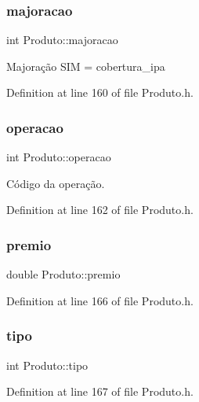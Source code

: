\subsubsection{\texorpdfstring{majoracao}{majoracao}}
{\footnotesize\ttfamily int Produto\+::majoracao\hspace{0.3cm}{\ttfamily [private]}}

Majoração S\+IM = cobertura\+\_\+ipa 

Definition at line 160 of file Produto.\+h.

\hypertarget{class_produto_a096269e399eb77578de837e329d3a052}{}\label{class_produto_a096269e399eb77578de837e329d3a052} 
\subsubsection{\texorpdfstring{operacao}{operacao}}
{\footnotesize\ttfamily int Produto\+::operacao\hspace{0.3cm}{\ttfamily [private]}}

Código da operação. 

Definition at line 162 of file Produto.\+h.

\hypertarget{class_produto_ae9f4beb63c585a39767d4206cece7810}{}\label{class_produto_ae9f4beb63c585a39767d4206cece7810} 
\subsubsection{\texorpdfstring{premio}{premio}}
{\footnotesize\ttfamily double Produto\+::premio\hspace{0.3cm}{\ttfamily [private]}}



Definition at line 166 of file Produto.\+h.

\hypertarget{class_produto_aace691096fd97d7ca03f5d9fab0270f7}{}\label{class_produto_aace691096fd97d7ca03f5d9fab0270f7} 
\subsubsection{\texorpdfstring{tipo}{tipo}}
{\footnotesize\ttfamily int Produto\+::tipo\hspace{0.3cm}{\ttfamily [private]}}



Definition at line 167 of file Produto.\+h.

